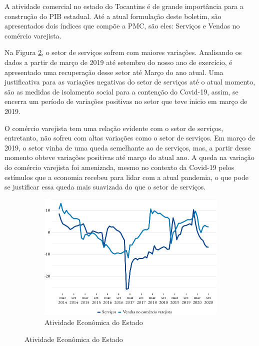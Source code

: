 \par A atividade comercial no estado do Tocantins é de grande importância para a construção do PIB estadual. Até a atual formulação deste boletim, são apresentados dois índices que compõe a PMC, são eles: Serviços e Vendas no comércio varejista.
\par Na Figura \ref{fig:pmc}, o setor de serviços sofrem com maiores variações. Analisando os dados a partir de março de 2019 até setembro do nosso ano de exercício, é apresentado uma recuperação desse setor até Março do ano atual. Uma justificativa para as variações negativas do setor de serviços até o atual momento, são as medidas de isolamento social para a contenção do Covid-19, assim, se encerra um período de variações positivas no setor que teve inicio em março de 2019.
\par O comércio varejista tem uma relação evidente com o setor de serviços, entretanto, não sofreu com altas variações como o setor de serviços. Em março de 2019, o setor vinha de uma queda semelhante ao de serviços, mas, a partir desse momento obteve variações positivas até março do atual ano. A queda na variação do comércio varejista foi amenizada, mesmo no contexto da Covid-19 pelos estímulos que a economia recebeu para lidar com a atual pandemia, o que pode se justificar essa queda mais suavizada do que o setor de serviços.
\begin{figure}[!h]
	\begin{subfigure}{\linewidth}
		\caption{Atividade Econômica do Estado}
		\label{fig:pmc}
		\includegraphics{fig/pmc_ibge-1.pdf}
	\end{subfigure}
\end{figure}

